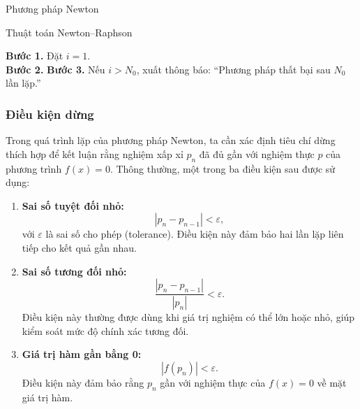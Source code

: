 \begin{algorithm}[H]
\caption{Phương pháp Newton}
\label{alg:newton}
\begin{algorithm}[!h]
\SetAlgoLined
{}
\BlankLine
\caption{Thuật toán Newton–Raphson}
\label{alg:newton_method}
\end{algorithm}


\BlankLine
\textbf{Bước 1.} Đặt $i = 1$. \\
\textbf{Bước 2.} 
\textbf{Bước 3.} Nếu $i > N_0$, xuất thông báo: “Phương pháp thất bại sau $N_0$ lần lặp.”
\end{algorithm}

\subsubsection*{Điều kiện dừng}

Trong quá trình lặp của phương pháp Newton, ta cần xác định tiêu chí dừng thích hợp 
để kết luận rằng nghiệm xấp xỉ $p_n$ đã đủ gần với nghiệm thực $p$ của phương trình $f(x)=0$. 
Thông thường, một trong ba điều kiện sau được sử dụng:

\begin{enumerate}
    \item \textbf{Sai số tuyệt đối nhỏ:}
    \[
        |p_{n} - p_{n-1}| < \varepsilon,
    \]
    với $\varepsilon$ là sai số cho phép (tolerance). 
    Điều kiện này đảm bảo hai lần lặp liên tiếp cho kết quả gần nhau.

    \item \textbf{Sai số tương đối nhỏ:}
    \[
        \frac{|p_{n} - p_{n-1}|}{|p_{n}|} < \varepsilon.
    \]
    Điều kiện này thường được dùng khi giá trị nghiệm có thể lớn hoặc nhỏ, 
    giúp kiểm soát mức độ chính xác tương đối.

    \item \textbf{Giá trị hàm gần bằng 0:}
    \[
        |f(p_n)| < \varepsilon.
    \]
    Điều kiện này đảm bảo rằng $p_n$ gần với nghiệm thực của $f(x)=0$ về mặt giá trị hàm.
\end{enumerate}

